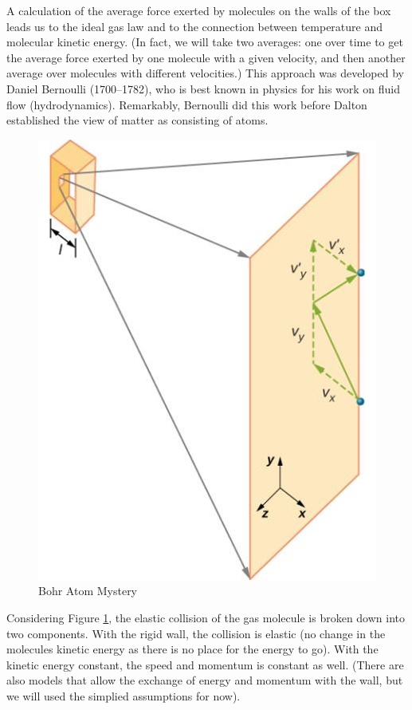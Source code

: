 \documentclass[14pt]{memoir}
\begin{document}
A calculation of the average force exerted by molecules on the walls of the box leads us to the ideal gas law and to the connection between temperature and molecular kinetic energy. (In fact, we will take two averages: one over time to get the average force exerted by one molecule with a given velocity, and then another average over molecules with different velocities.) This approach was developed by Daniel Bernoulli (1700–1782), who is best known in physics for his work on fluid flow (hydrodynamics). Remarkably, Bernoulli did this work before Dalton established the view of matter as consisting of atoms.

\begin{figure}[H]
\begin{center}
\includegraphics[scale=1]{fig/fig_02_10.jpg}
\caption{Bohr Atom Mystery}
\label{fig:02_10}
\end{center}
\end{figure} 

Considering Figure \ref{fig:02_10}, the elastic collision of the gas molecule is broken down into two components. With the rigid wall, the collision is elastic (no change in the molecules kinetic energy as there is no place for the energy to go). With the kinetic energy constant, the speed and momentum is constant as well. (There are also models that allow the exchange of energy and momentum with the wall, but we will used the simplied assumptions for now).
\end{document}

